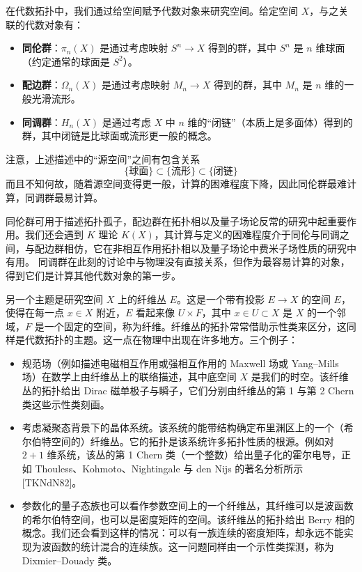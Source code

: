 在代数拓扑中，我们通过给空间赋予代数对象来研究空间。给定空间 $X$，与之关联的代数对象有：

\begin{itemize}
  \item \textbf{同伦群}：$\pi_n(X)$ 是通过考虑映射 $S^n\to X$ 得到的群，其中 $S^n$ 是 $n$ 维球面（约定通常的球面是 $S^2$）。
  \item \textbf{配边群}：$\Omega_n(X)$ 是通过考虑映射 $M_n\to X$ 得到的群，其中 $M_n$ 是 $n$ 维的一般光滑流形。
  \item \textbf{同调群}：$H_n(X)$ 是通过考虑 $X$ 中 $n$ 维的“闭链”（本质上是多面体）得到的群，其中闭链是比球面或流形更一般的概念。
\end{itemize}

注意，上述描述中的“源空间”之间有包含关系
\[
  \{\text{球面}\}\subset\{\text{流形}\}\subset\{\text{闭链}\}
  \tag{1.1}
\]
而且不知何故，随着源空间变得更一般，计算的困难程度下降，因此同伦群最难计算，同调群最易计算。

同伦群可用于描述拓扑孤子，配边群在拓扑相以及量子场论反常的研究中起重要作用。我们还会遇到 $K$ 理论 $K(X)$，其计算与定义的困难程度介于同伦与同调之间，与配边群相仿，它在非相互作用拓扑相以及量子场论中费米子场性质的研究中有用。
同调群在此刻的讨论中与物理没有直接关系，但作为最容易计算的对象，得到它们是计算其他代数对象的第一步。


另一个主题是研究空间 $X$ 上的纤维丛 $E$。这是一个带有投影 $E\to X$ 的空间 $E$，使得在每一点 $x\in X$ 附近，$E$ 看起来像 $U\times F$，其中 $x\in U\subset X$ 是 $X$ 的一个邻域，$F$ 是一个固定的空间，称为纤维。纤维丛的拓扑常常借助示性类来区分，这同样是代数拓扑的主题。这一点在物理中出现在许多地方。三个例子：

\begin{itemize}
  \item 规范场（例如描述电磁相互作用或强相互作用的 Maxwell 场或 Yang--Mills 场）在数学上由纤维丛上的联络描述，其中底空间 $X$ 是我们的时空。该纤维丛的拓扑给出 Dirac 磁单极子与瞬子，它们分别由纤维丛的第 1 与第 2 Chern 类这些示性类刻画。
  \item 考虑凝聚态背景下的晶体系统。该系统的能带结构确定布里渊区上的一个（希尔伯特空间的）纤维丛。它的拓扑是该系统许多拓扑性质的根源。例如对 $2+1$ 维系统，该丛的第 1 Chern 类（一个整数）给出量子化的霍尔电导，正如 Thouless、Kohmoto、Nightingale 与 den Nijs 的著名分析所示 [TKNdN82]。
  \item 参数化的量子态族也可以看作参数空间上的一个纤维丛，其纤维可以是波函数的希尔伯特空间，也可以是密度矩阵的空间。该纤维丛的拓扑给出 Berry 相的概念。我们还会看到这样的情况：可以有一族连续的密度矩阵，却永远不能实现为波函数的统计混合的连续族。这一问题同样由一个示性类探测，称为 Dixmier--Douady 类。
\end{itemize}

